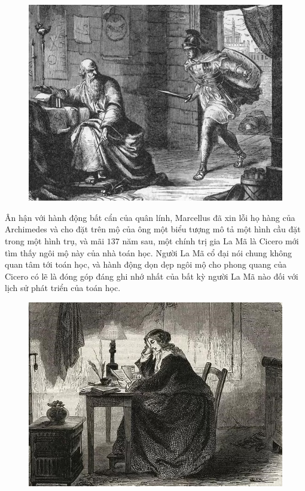 \begin{multicols}{2}
\begin{figure}[H]
		\includegraphics[width= 1\linewidth]{2}
		\vspace*{-15pt}
	\end{figure}
	Ân hận với hành động bất cẩn của quân lính, Marcellus đã xin lỗi họ hàng của Archimedes và cho đặt trên mộ của ông một biểu tượng mô tả một hình cầu đặt trong một hình trụ, và mãi $137$ năm sau, một chính trị gia La Mã là Cicero mới tìm thấy ngôi mộ này của nhà toán học. Người La Mã cổ đại nói chung không quan tâm tới toán học, và hành động dọn dẹp ngôi mộ cho phong quang của Cicero có lẽ là đóng góp đáng ghi nhớ nhất của bất kỳ người La Mã nào đối với lịch sử phát triển của toán học.
	\begin{figure}[H]
		\vspace*{-5pt}
		\centering
		\captionsetup{labelformat= empty, justification=centering}
		\includegraphics[width= 1\linewidth]{4}

\end{figure}
\end{multicols}
